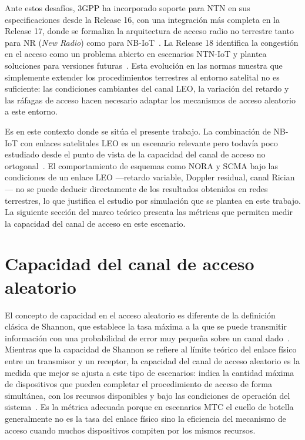 Ante estos desafíos, 3GPP ha incorporado soporte para NTN en sus especificaciones desde la
Release 16, con una integración más completa en la Release 17, donde se formaliza la
arquitectura de acceso radio no terrestre tanto para NR (\textit{New Radio}) como para
NB-IoT~\cite{ref7}. La Release 18 identifica la congestión en el acceso como un problema
abierto en escenarios NTN-IoT y plantea soluciones para versiones futuras~\cite{ref7}. Esta
evolución en las normas muestra que simplemente extender los procedimientos terrestres al
entorno satelital no es suficiente: las condiciones cambiantes del canal LEO, la variación
del retardo y las ráfagas de acceso hacen necesario adaptar los mecanismos de acceso
aleatorio a este entorno.

Es en este contexto donde se sitúa el presente trabajo. La combinación de NB-IoT con enlaces
satelitales LEO es un escenario relevante pero todavía poco estudiado desde el punto de vista
de la capacidad del canal de acceso no ortogonal~\cite{ref5, ref8, ref7}. El comportamiento
de esquemas como NORA y SCMA bajo las condiciones de un enlace LEO ---retardo variable,
Doppler residual, canal Rician--- no se puede deducir directamente de los resultados
obtenidos en redes terrestres, lo que justifica el estudio por simulación que se plantea en
este trabajo. La siguiente sección del marco teórico presenta las métricas que
permiten medir la capacidad del canal de acceso en este escenario.


\section{Capacidad del canal de acceso aleatorio}

El concepto de capacidad en el acceso aleatorio es diferente de la definición clásica de
Shannon, que establece la tasa máxima a la que se puede transmitir información con una
probabilidad de error muy pequeña sobre un canal dado~\cite{ref17}. Mientras que la capacidad
de Shannon se refiere al límite teórico del enlace físico entre un transmisor y un receptor,
la capacidad del canal de acceso aleatorio es la medida que mejor se ajusta a este tipo de
escenarios: indica la cantidad máxima de dispositivos que pueden completar el procedimiento
de acceso de forma simultánea, con los recursos disponibles y bajo las condiciones de
operación del sistema~\cite{ref5, ref6, ref9}. Es la métrica adecuada porque en escenarios
MTC el cuello de botella generalmente no es la tasa del enlace físico sino la eficiencia del
mecanismo de acceso cuando muchos dispositivos compiten por los mismos recursos.

